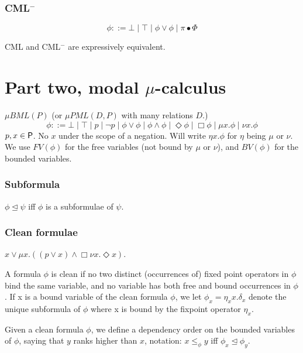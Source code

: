   \subsubsection{CML$^-$}
  \label{sec:cml-1}
  \[\phi ::= \bot \mid \top \mid \phi \lor \phi \mid \pi \bullet \Phi\]

  \begin{theorem}
    \label{thr:2}
    CML and CML$^-$ are expressively equivalent.
  \end{theorem}
  
\section{Part two, modal $\mu$-calculus}
\label{sec:part-two}
$\mu BML(P)$ (or $\mu PML(D,P)$ with many relations $D$.)
\[\phi ::= \bot \mid \top \mid p \mid \neg p \mid \phi \lor \phi \mid \phi \land \phi \mid \Diamond\phi \mid \Box\phi  \mid \mu x.\phi  \mid \nu x.\phi   \]
$p,x \in \mathsf{P}$. No $x$ under the scope of a negation. Will write $\eta x.\phi$ for
$\eta$ being $\mu$ or $\nu$. We use $FV(\phi)$ for the free variables (not bound by $\mu$ or
$\nu$), and $BV(\phi)$ for the bounded variables.

\subsubsection{Subformula}
\label{sec:subformula}
$\phi \trianglelefteq \psi$ iff $\phi$ is a subformulae of $\psi$.

\subsubsection{Clean formulae}
\label{sec:clean-formulae}
$x \lor \mu x.((p \lor x) \land \Box\nu x.\Diamond x)$.

\begin{definition}[Clean]
  \label{def:3}
  A formula $\phi$ is clean if no two distinct (occurrences of) fixed point
  operators in $\phi$ bind the same variable, and no variable has both free and
  bound occurrences in $\phi$. If x is a bound variable of the clean formula
  $\phi$, we let $\phi_{x} = \eta_{x} x.\delta_{x}$ denote the unique subformula
  of $\phi$ where x is bound by the fixpoint operator $\eta_{x}$.
\end{definition}

\begin{definition}
  \label{def:4}
   Given a clean formula $\phi$, we define a dependency order on the bounded
   variables of $\phi$, saying that $y$ ranks higher than $x$, notation:  $x\leq_{\phi}y$
   iff $\phi_{x} \trianglelefteq \phi_{y}$.
 \end{definition}


